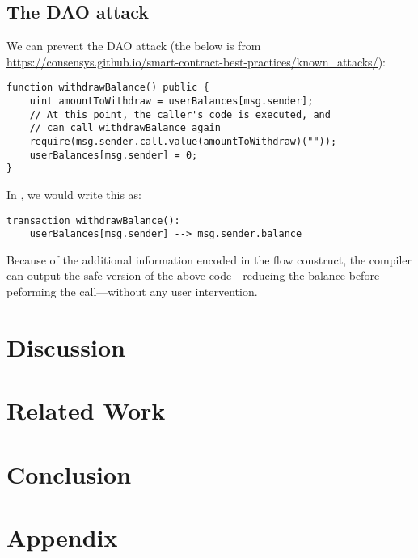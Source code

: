 \documentclass[sigconf]{acmart}
\begin{document}
\subsection{The DAO attack}
We can prevent the DAO attack (the below is from \url{https://consensys.github.io/smart-contract-best-practices/known_attacks/}):
\begin{lstlisting}
function withdrawBalance() public {
    uint amountToWithdraw = userBalances[msg.sender];
    // At this point, the caller's code is executed, and
    // can call withdrawBalance again
    require(msg.sender.call.value(amountToWithdraw)(""));
    userBalances[msg.sender] = 0;
}
\end{lstlisting}

In \langName, we would write this as:

\begin{lstlisting}
transaction withdrawBalance():
    userBalances[msg.sender] --> msg.sender.balance
\end{lstlisting}

Because of the additional information encoded in the flow construct, the compiler can output the safe version of the above code---reducing the balance before peforming the call---without any user intervention.

\section{Discussion}

\section{Related Work}

\section{Conclusion}




\appendix

\section{Appendix}
\end{document}
